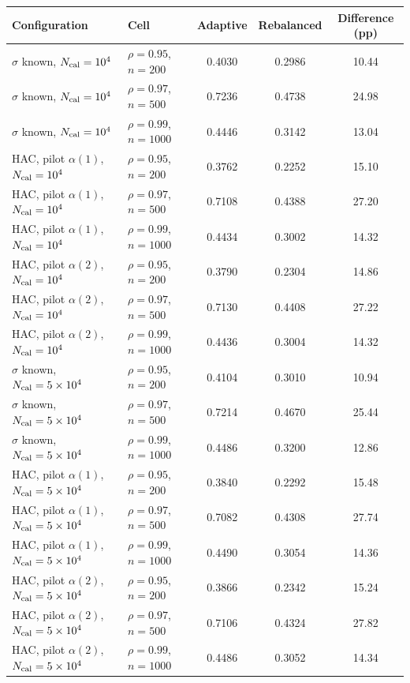\begin{tabular}{llccc}
\toprule
Configuration & Cell & Adaptive & Rebalanced & Difference (pp) \\
\midrule
$\sigma$ known, $N_{\mathrm{cal}} = 10^{4}$ & $\rho = 0.95$, $n = 200$ & 0.4030 & 0.2986 & 10.44 \\
$\sigma$ known, $N_{\mathrm{cal}} = 10^{4}$ & $\rho = 0.97$, $n = 500$ & 0.7236 & 0.4738 & 24.98 \\
$\sigma$ known, $N_{\mathrm{cal}} = 10^{4}$ & $\rho = 0.99$, $n = 1000$ & 0.4446 & 0.3142 & 13.04 \\
\addlinespace
HAC, pilot $\alpha(1)$, $N_{\mathrm{cal}} = 10^{4}$ & $\rho = 0.95$, $n = 200$ & 0.3762 & 0.2252 & 15.10 \\
HAC, pilot $\alpha(1)$, $N_{\mathrm{cal}} = 10^{4}$ & $\rho = 0.97$, $n = 500$ & 0.7108 & 0.4388 & 27.20 \\
HAC, pilot $\alpha(1)$, $N_{\mathrm{cal}} = 10^{4}$ & $\rho = 0.99$, $n = 1000$ & 0.4434 & 0.3002 & 14.32 \\
\addlinespace
HAC, pilot $\alpha(2)$, $N_{\mathrm{cal}} = 10^{4}$ & $\rho = 0.95$, $n = 200$ & 0.3790 & 0.2304 & 14.86 \\
HAC, pilot $\alpha(2)$, $N_{\mathrm{cal}} = 10^{4}$ & $\rho = 0.97$, $n = 500$ & 0.7130 & 0.4408 & 27.22 \\
HAC, pilot $\alpha(2)$, $N_{\mathrm{cal}} = 10^{4}$ & $\rho = 0.99$, $n = 1000$ & 0.4436 & 0.3004 & 14.32 \\
\addlinespace
$\sigma$ known, $N_{\mathrm{cal}} = 5\times10^{4}$ & $\rho = 0.95$, $n = 200$ & 0.4104 & 0.3010 & 10.94 \\
$\sigma$ known, $N_{\mathrm{cal}} = 5\times10^{4}$ & $\rho = 0.97$, $n = 500$ & 0.7214 & 0.4670 & 25.44 \\
$\sigma$ known, $N_{\mathrm{cal}} = 5\times10^{4}$ & $\rho = 0.99$, $n = 1000$ & 0.4486 & 0.3200 & 12.86 \\
\addlinespace
HAC, pilot $\alpha(1)$, $N_{\mathrm{cal}} = 5\times10^{4}$ & $\rho = 0.95$, $n = 200$ & 0.3840 & 0.2292 & 15.48 \\
HAC, pilot $\alpha(1)$, $N_{\mathrm{cal}} = 5\times10^{4}$ & $\rho = 0.97$, $n = 500$ & 0.7082 & 0.4308 & 27.74 \\
HAC, pilot $\alpha(1)$, $N_{\mathrm{cal}} = 5\times10^{4}$ & $\rho = 0.99$, $n = 1000$ & 0.4490 & 0.3054 & 14.36 \\
\addlinespace
HAC, pilot $\alpha(2)$, $N_{\mathrm{cal}} = 5\times10^{4}$ & $\rho = 0.95$, $n = 200$ & 0.3866 & 0.2342 & 15.24 \\
HAC, pilot $\alpha(2)$, $N_{\mathrm{cal}} = 5\times10^{4}$ & $\rho = 0.97$, $n = 500$ & 0.7106 & 0.4324 & 27.82 \\
HAC, pilot $\alpha(2)$, $N_{\mathrm{cal}} = 5\times10^{4}$ & $\rho = 0.99$, $n = 1000$ & 0.4486 & 0.3052 & 14.34 \\
\bottomrule
\end{tabular}
